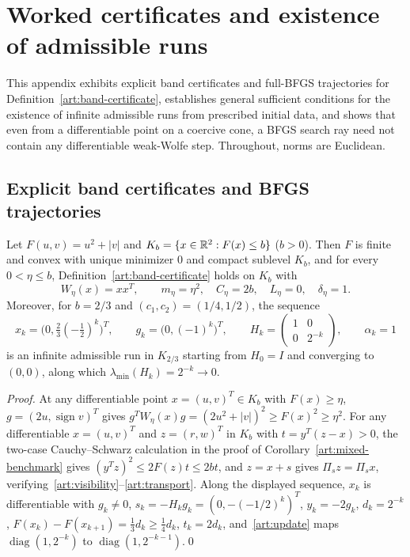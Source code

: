 \section{Worked certificates and existence of admissible runs}\label{art:hypothesis-examples}

This appendix exhibits explicit band certificates and full-BFGS trajectories for
Definition~\ref{art:band-certificate}, establishes general sufficient conditions
for the existence of infinite admissible runs from prescribed initial data, and
shows that even from a differentiable point on a coercive cone, a BFGS search
ray need not contain any differentiable weak-Wolfe step. Throughout, norms are
Euclidean.

\subsection{Explicit band certificates and BFGS trajectories}

\begin{proposition}\label{art:examples-mixed}
Let $F(u,v)=u^2+|v|$ and $K_b=\{x\in\mathbb R^2:F(x)\le b\}$ ($b>0$). Then $F$ is
finite and convex with unique minimizer $0$ and compact sublevel $K_b$, and for
every $0<\eta\le b$, Definition~\ref{art:band-certificate} holds on $K_b$ with
\[
 W_\eta(x)=xx^T,\qquad m_\eta=\eta^2,\quad C_\eta=2b,
 \quad L_\eta=0,\quad\delta_\eta=1.
\]
Moreover, for $b=2/3$ and $(c_1,c_2)=(1/4,1/2)$, the sequence
\[
 x_k=\bigl(0,\tfrac23(-\tfrac12)^k\bigr)^T,\qquad
 g_k=\bigl(0,(-1)^k\bigr)^T,\qquad
 H_k=\begin{pmatrix}1&0\\0&2^{-k}\end{pmatrix},\qquad \alpha_k=1
\]
is an infinite admissible run in $K_{2/3}$ starting from $H_0=I$ and converging
to $(0,0)$, along which $\lambda_{\min}(H_k)=2^{-k}\to0$.
\end{proposition}
\begin{proof}
At any differentiable point $x=(u,v)^T\in K_b$ with $F(x)\ge\eta$,
$g=(2u,\operatorname{sign}v)^T$ gives $g^TW_\eta(x)g=(2u^2+|v|)^2\ge F(x)^2\ge\eta^2$.
For any differentiable $x=(u,v)^T$ and $z=(r,w)^T$ in $K_b$ with $t=y^T(z-x)>0$,
the two-case Cauchy--Schwarz calculation in the proof of
Corollary~\ref{art:mixed-benchmark} gives $(y^Tz)^2\le2F(z)t\le2bt$, and
$z=x+s$ gives $\Pi_sz=\Pi_sx$, verifying~\eqref{art:visibility}--\eqref{art:transport}.
Along the displayed sequence, $x_k$ is differentiable with $g_k\ne0$,
$s_k=-H_kg_k=(0,-(-1/2)^k)^T$, $y_k=-2g_k$, $d_k=2^{-k}$,
$F(x_k)-F(x_{k+1})=\tfrac13d_k\ge\tfrac14d_k$, $t_k=2d_k$, and~\eqref{art:update}
maps $\operatorname{diag}(1,2^{-k})$ to $\operatorname{diag}(1,2^{-k-1})$.\qed
\end{proof}

